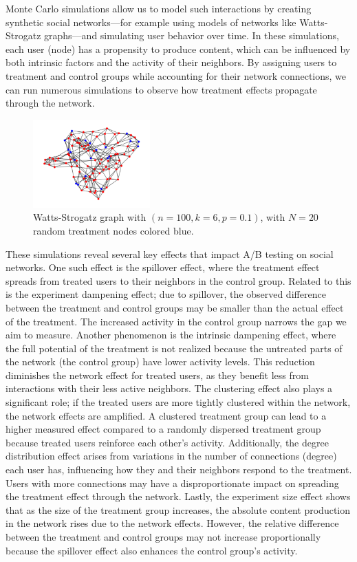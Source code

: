 \documentclass[final,5p,times,twocolumn,authoryear]{elsarticle}
\begin{document}
Monte Carlo simulations allow us to model such interactions by creating synthetic social networks—for example using models of networks like Watts-Strogatz graphs—and simulating user behavior over time. In these simulations, each user (node) has a propensity to produce content, which can be influenced by both intrinsic factors and the activity of their neighbors. By assigning users to treatment and control groups while accounting for their network connections, we can run numerous simulations to observe how treatment effects propagate through the network.

\begin{figure}[h]
  \centering 
  \includegraphics[width=0.4\textwidth]{fig-6.png}  
  \caption{Watts-Strogatz graph with $(n=100, k=6, p=0.1)$, with $N=20$ random treatment nodes colored blue.}
\end{figure}

These simulations reveal several key effects that impact A/B testing on social networks. One such effect is the spillover effect, where the treatment effect spreads from treated users to their neighbors in the control group. Related to this is the experiment dampening effect; due to spillover, the observed difference between the treatment and control groups may be smaller than the actual effect of the treatment. The increased activity in the control group narrows the gap we aim to measure. Another phenomenon is the intrinsic dampening effect, where the full potential of the treatment is not realized because the untreated parts of the network (the control group) have lower activity levels. This reduction diminishes the network effect for treated users, as they benefit less from interactions with their less active neighbors. The clustering effect also plays a significant role; if the treated users are more tightly clustered within the network, the network effects are amplified. A clustered treatment group can lead to a higher measured effect compared to a randomly dispersed treatment group because treated users reinforce each other's activity. Additionally, the degree distribution effect arises from variations in the number of connections (degree) each user has, influencing how they and their neighbors respond to the treatment. Users with more connections may have a disproportionate impact on spreading the treatment effect through the network. Lastly, the experiment size effect shows that as the size of the treatment group increases, the absolute content production in the network rises due to the network effects. However, the relative difference between the treatment and control groups may not increase proportionally because the spillover effect also enhances the control group's activity.
\end{document}
